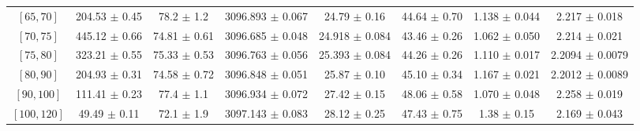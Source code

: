 \begin{tabular}{c||c|c|c|c|c|c|c}
$[65, 70]$ & 204.53 $\pm$ 0.45 & 78.2 $\pm$ 1.2 & 3096.893 $\pm$ 0.067 & 24.79 $\pm$ 0.16 & 44.64 $\pm$ 0.70 & 1.138 $\pm$ 0.044 & 2.217 $\pm$ 0.018\\
$[70, 75]$ & 445.12 $\pm$ 0.66 & 74.81 $\pm$ 0.61 & 3096.685 $\pm$ 0.048 & 24.918 $\pm$ 0.084 & 43.46 $\pm$ 0.26 & 1.062 $\pm$ 0.050 & 2.214 $\pm$ 0.021\\
$[75, 80]$ & 323.21 $\pm$ 0.55 & 75.33 $\pm$ 0.53 & 3096.763 $\pm$ 0.056 & 25.393 $\pm$ 0.084 & 44.26 $\pm$ 0.26 & 1.110 $\pm$ 0.017 & 2.2094 $\pm$ 0.0079\\
$[80, 90]$ & 204.93 $\pm$ 0.31 & 74.58 $\pm$ 0.72 & 3096.848 $\pm$ 0.051 & 25.87 $\pm$ 0.10 & 45.10 $\pm$ 0.34 & 1.167 $\pm$ 0.021 & 2.2012 $\pm$ 0.0089\\
$[90, 100]$ & 111.41 $\pm$ 0.23 & 77.4 $\pm$ 1.1 & 3096.934 $\pm$ 0.072 & 27.42 $\pm$ 0.15 & 48.06 $\pm$ 0.58 & 1.070 $\pm$ 0.048 & 2.258 $\pm$ 0.019\\
$[100, 120]$ & 49.49 $\pm$ 0.11 & 72.1 $\pm$ 1.9 & 3097.143 $\pm$ 0.083 & 28.12 $\pm$ 0.25 & 47.43 $\pm$ 0.75 & 1.38 $\pm$ 0.15 & 2.169 $\pm$ 0.043\\
\end{tabular}
